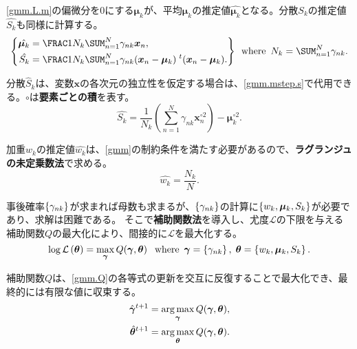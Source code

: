 \documentclass[10pt,a4paper]{book}
\begin{document}
\eqref{gmm.L.m}の偏微分を0にする$\bm{\mu}_k$が、平均$\bm{\mu}_k$の推定値$\hat{\bm{\mu}_k}$となる。分散$S_k$の推定値$\hat{S_k}$も同様に計算する。
%
\begin{equation}
\label{eq:gmm.mstep.m}
\left\{
\begin{aligned}
\hat{\bm{\mu}_k} &= \frac{1}{N_k} \sum_{n=1}^N \gamma_{nk} \bm{x}_n,\\
\hat{S_k} &= \frac{1}{N_k} \sum_{n=1}^N \gamma_{nk} (\bm{x}_n - \bm{\mu}_k)\;\trans{(\bm{x}_n - \bm{\mu}_k)}.
\end{aligned}
\right\}
\where N_k = \sum_{n=1}^N \gamma_{nk}.
\end{equation}

分散$\hat{S}_k$は、変数$\bm{x}$の各次元の独立性を仮定する場合は、\eqref{gmm.mstep.s}で代用できる。$\circ$は\textbf{要素ごとの積}を表す。
%
\begin{equation}
\label{eq:gmm.mstep.s}
\hat{S_k} = \frac{1}{N_k} \left(\sum_{n=1}^N \gamma_{nk} \bm{x}_n^{\circ 2}\right) - \bm{\mu}_k^{\circ 2}.
\end{equation}

加重$w_k$の推定値$\hat{w_k}$は、\eqref{gmm}の制約条件を満たす必要があるので、\textbf{ラグランジュの未定乗数法}で求める。
%
\begin{equation}
\label{eq:gmm.mstep.w}
\hat{w_k} = \frac{N_k}{N}.
\end{equation}

事後確率$\seq{\gamma_{nk}}$が求まれば母数も求まるが、$\seq{\gamma_{nk}}$の計算に$\seq{w_k,\bm{\mu}_k,S_k}$が必要であり、求解は困難である。
そこで\textbf{補助関数法}を導入し、尤度$\mathcal{L}$の下限を与える補助関数$Q$の最大化により、間接的に$\mathcal{L}$を最大化する。
%
\begin{equation}
\log \Lk{\bm{\theta}} = \max_{\bm{\gamma}} Q(\bm{\gamma}, \bm{\theta})\;
\where \bm{\gamma} = \seq{\gamma_{nk}},\;\bm{\theta}=\seq{w_k,\bm{\mu}_k,S_k}.
\end{equation}

補助関数$Q$は、\eqref{gmm.Q}の各等式の更新を交互に反復することで最大化でき、最終的には有限な値に収束する。
%
\begin{equation}
\label{eq:gmm.Q}
\begin{aligned}
\hat{\bm{\gamma}}^{t+1} &= \operatorname*{arg\,max}_{\bm{\gamma}} Q(\bm{\gamma}, \bm{\theta}), \\
\hat{\bm{\theta}}^{t+1} &= \operatorname*{arg\,max}_{\bm{\theta}} Q(\bm{\gamma}, \bm{\theta}).
\end{aligned}
\end{equation}
\end{document}

